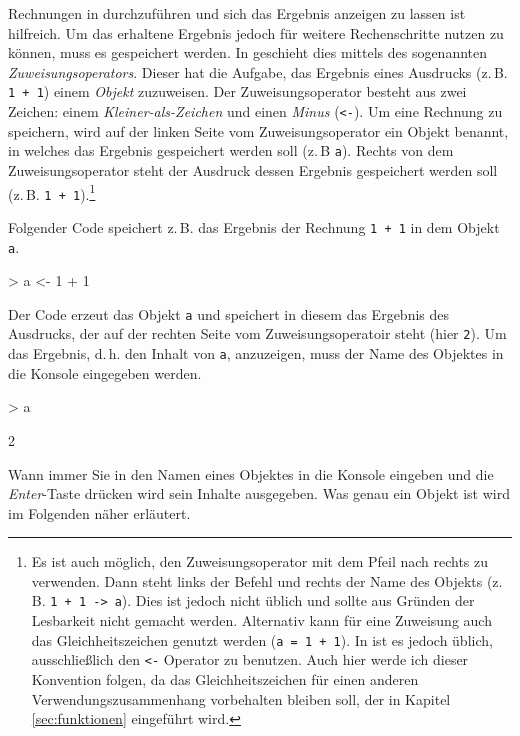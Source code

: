 Rechnungen in \R{} durchzuführen und sich das Ergebnis anzeigen zu lassen ist hilfreich. Um das erhaltene Ergebnis jedoch für weitere Rechenschritte nutzen zu können, muss es gespeichert werden. In \R{} geschieht dies mittels des sogenannten \emph{Zuweisungsoperators}. Dieser hat die Aufgabe, das Ergebnis eines Ausdrucks (z.\,B.  \verb!1 + 1!) einem \emph{Objekt} zuzuweisen. Der Zuweisungsoperator besteht aus zwei Zeichen: einem \emph{Kleiner-als-Zeichen} und einen \emph{Minus} (\verb!<-!). Um eine Rechnung zu speichern, wird auf der linken Seite vom Zuweisungsoperator ein Objekt benannt, in welches das Ergebnis gespeichert werden soll (z.\,B \texttt{a}). Rechts von dem Zuweisungsoperator steht der Ausdruck dessen Ergebnis gespeichert werden soll (z.\,B. \verb!1 + 1!).\footnote{Es ist auch möglich, den Zuweisungsoperator mit dem Pfeil nach rechts zu verwenden. Dann steht links der Befehl und rechts der Name des Objekts (z.\,B. \texttt{1 + 1 -> a}). Dies ist jedoch nicht üblich und sollte aus Gründen der Lesbarkeit nicht gemacht werden.
Alternativ kann für eine Zuweisung auch das Gleichheitszeichen genutzt werden (\texttt{a = 1 + 1}). In \R{} ist es jedoch üblich, ausschließlich den \texttt{<-} Operator zu benutzen. Auch hier werde ich dieser Konvention folgen, da das Gleichheitszeichen für einen anderen Verwendungszusammenhang vorbehalten bleiben soll, der in Kapitel \ref{sec:funktionen} eingeführt wird.}        

Folgender Code speichert z.\,B. das Ergebnis der Rechnung \verb!1 + 1! in dem Objekt \verb!a!. 

\begin{Schunk}
\begin{Sinput}
> a <- 1 + 1 
\end{Sinput}
\end{Schunk}

Der Code erzeut das Objekt \texttt{a} und speichert in diesem das Ergebnis des Ausdrucks, der auf der rechten Seite vom Zuweisungsoperatoir steht (hier \verb!2!). Um das Ergebnis, d.\,h. den Inhalt von \texttt{a}, anzuzeigen, muss der Name des Objektes in die Konsole eingegeben werden.

\begin{Schunk}
\begin{Sinput}
> a
\end{Sinput}
\begin{Soutput}
[1] 2
\end{Soutput}
\end{Schunk}

Wann immer Sie in \R{} den Namen eines Objektes in die Konsole eingeben und die \emph{Enter}-Taste drücken wird sein Inhalte ausgegeben. Was genau ein Objekt ist wird im Folgenden näher erläutert.


